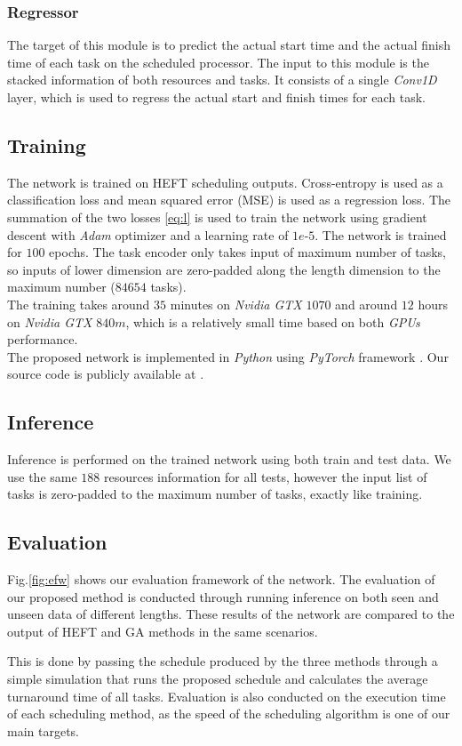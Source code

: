 \subsubsection{Regressor}
The target of this module is to predict the actual start time and the actual finish time of each task on the scheduled processor. The input to this module is the stacked information of both resources and tasks. It consists of a single \emph{Conv1D} layer, which is used to regress the actual start and finish times for each task. 

\subsection{Training}
The network is trained on HEFT scheduling outputs. Cross-entropy is used as a classification loss and mean squared error (MSE) is used as a regression loss. The summation of the two losses \ref{eq:l} is used to train the network using gradient descent with \emph{Adam} optimizer and a learning rate of $1e$-$5$. The network is trained for $100$ epochs. The task encoder only takes input of maximum number of tasks, so inputs of lower dimension are zero-padded along the length dimension to the maximum number ($84654$ tasks). \\

The training takes around $35$ minutes on \emph{Nvidia GTX} $1070$ and around $12$ hours on \emph{Nvidia GTX} $840m$, which is a relatively small time based on both \emph{GPUs} performance. \\

The proposed network is implemented in \emph{Python} using \emph{PyTorch} framework \cite{paszke2019pytorch}.  Our source code is publicly available at .

\subsection{Inference}
Inference is performed on the trained network using both train and test data. We use the same $188$ resources information for all tests, however the input list of tasks is zero-padded to the maximum number of tasks, exactly like training.

\subsection{Evaluation}
Fig.\ref{fig:efw} shows our evaluation framework of the network. The evaluation of our proposed method is conducted through running inference on both seen and unseen data of different lengths. These results of the network are compared to the output of HEFT and GA methods in the same scenarios. 

This is done by passing the schedule produced by the three methods through a simple simulation that runs the proposed schedule and calculates the average turnaround time of all tasks. Evaluation is also conducted on the execution time of each scheduling method, as the speed of the scheduling algorithm is one of our main targets.